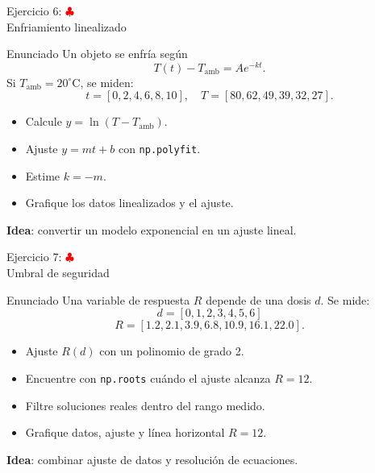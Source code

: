 \documentclass[10pt]{beamer}
\begin{document}
\begin{frame}{Ejercicio 6: \hfill \textcolor{red}{$\clubsuit$} \\ Enfriamiento linealizado}
  \begin{block}{Enunciado}
    Un objeto se enfría según
    \[
      T(t)-T_{\mathrm{amb}} = A e^{-kt}.
    \]
    Si \(T_{\mathrm{amb}}=20^\circ\mathrm{C}\), se miden:
    \[
      t=[0,2,4,6,8,10],\quad T=[80,62,49,39,32,27].
    \]
    \begin{itemize}
      \item Calcule \(y=\ln(T-T_{\mathrm{amb}})\).
      \item Ajuste \(y=mt+b\) con \texttt{np.polyfit}.
      \item Estime \(k=-m\).
      \item Grafique los datos linealizados y el ajuste.
    \end{itemize}
  \end{block}

  \textbf{Idea}: convertir un modelo exponencial en un ajuste lineal.
\end{frame}

\begin{frame}{Ejercicio 7: \hfill \textcolor{red}{$\clubsuit$} \\ Umbral de seguridad}
  \begin{block}{Enunciado}
    Una variable de respuesta \(R\) depende de una dosis \(d\). Se mide:
    \[
      d=[0,1,2,3,4,5,6]
    \]
    \[
      R=[1.2,2.1,3.9,6.8,10.9,16.1,22.0].
    \]
    \begin{itemize}
      \item Ajuste \(R(d)\) con un polinomio de grado 2.
      \item Encuentre con \texttt{np.roots} cuándo el ajuste alcanza \(R=12\).
      \item Filtre soluciones reales dentro del rango medido.
      \item Grafique datos, ajuste y línea horizontal \(R=12\).
    \end{itemize}
  \end{block}

  \textbf{Idea}: combinar ajuste de datos y resolución de ecuaciones.
\end{frame}
\end{document}
